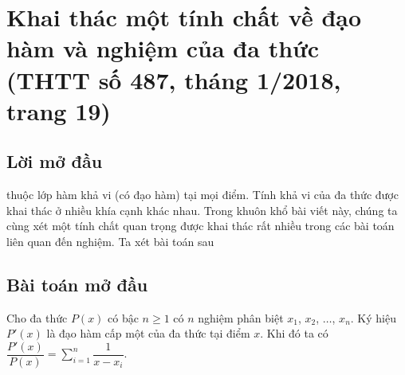 \section{Khai thác một tính chất về đạo hàm và nghiệm của đa thức (THTT số 487, tháng 1/2018, trang 19)}
\begin{center}
	\textbf{\color{violet}{Nguyễn Thành Nhân\\
			(GV THPT Chuyên Hùng Vương, Bình Dương)}}
\end{center}
\subsection{Lời mở đầu}
 thuộc lớp hàm khả vi (có đạo hàm) tại mọi điểm. Tính khả vi của đa thức được khai thác ở nhiều khía cạnh khác nhau. Trong khuôn khổ bài viết này, chúng ta cùng xét một tính chất quan trọng được khai thác rất nhiều trong các bài toán liên quan đến nghiệm. Ta xét bài toán sau

\subsection{Bài toán mở đầu}

\begin{bt}%
	Cho đa thức $P(x)$ có bậc $n\ge 1$ có $n$ nghiệm phân biệt $x_1$, $x_2$, $\ldots$, $x_n$. Ký hiệu $P'(x)$ là đạo hàm cấp một của đa thức tại điểm $x$. Khi đó ta có $\dfrac{P'(x)}{P(x)}=\displaystyle\sum\limits_{i=1}^{n}{\dfrac{1}{x-x_i}}$.
\end{bt}
\setcounter{bt}{0}
